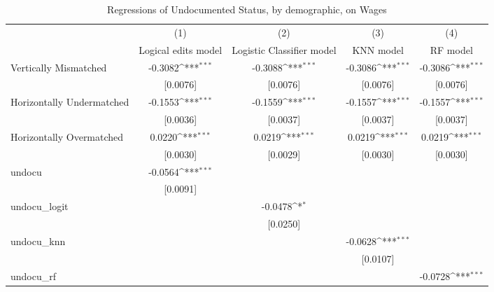 \begin{table}[htbp]\centering
\def\sym#1{\ifmmode^{#1}\else\(^{#1}\)\fi}
\caption{Regressions of Undocumented Status, by demographic, on Wages}
\begin{tabular}{l*{4}{c}}
\toprule
                    &\multicolumn{1}{c}{(1)}         &\multicolumn{1}{c}{(2)}         &\multicolumn{1}{c}{(3)}         &\multicolumn{1}{c}{(4)}         \\
                    &Logical edits model         &Logistic Classifier model         &   KNN model         &    RF model         \\
\midrule
Vertically Mismatched&     -0.3082\sym{***}&     -0.3088\sym{***}&     -0.3086\sym{***}&     -0.3086\sym{***}\\
                    &    [0.0076]         &    [0.0076]         &    [0.0076]         &    [0.0076]         \\
\addlinespace
Horizontally Undermatched&     -0.1553\sym{***}&     -0.1559\sym{***}&     -0.1557\sym{***}&     -0.1557\sym{***}\\
                    &    [0.0036]         &    [0.0037]         &    [0.0037]         &    [0.0037]         \\
\addlinespace
Horizontally Overmatched&      0.0220\sym{***}&      0.0219\sym{***}&      0.0219\sym{***}&      0.0219\sym{***}\\
                    &    [0.0030]         &    [0.0029]         &    [0.0030]         &    [0.0030]         \\
\addlinespace
undocu              &     -0.0564\sym{***}&                     &                     &                     \\
                    &    [0.0091]         &                     &                     &                     \\
\addlinespace
undocu\_logit        &                     &     -0.0478\sym{*}  &                     &                     \\
                    &                     &    [0.0250]         &                     &                     \\
\addlinespace
undocu\_knn          &                     &                     &     -0.0628\sym{***}&                     \\
                    &                     &                     &    [0.0107]         &                     \\
\addlinespace
undocu\_rf           &                     &                     &                     &     -0.0728\sym{***}\\

\end{tabular}
\end{table}
